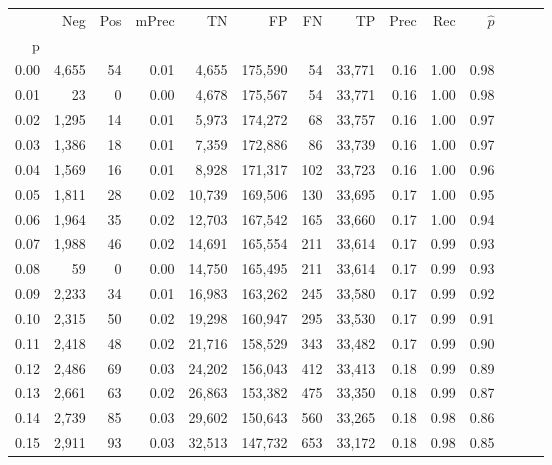 \begin{tabular}{rrrrrrrrrrrrrr}
\toprule
{} &    Neg &    Pos & mPrec &       TN &       FP &      FN &      TP &  Prec &   Rec & $\hat{p}$ \\
p    &        &        &       &          &          &         &         &       &       &           \\
\midrule
0.00 &  4,655 &     54 &  0.01 &    4,655 &  175,590 &      54 &  33,771 &  0.16 &  1.00 &      0.98 \\
0.01 &     23 &      0 &  0.00 &    4,678 &  175,567 &      54 &  33,771 &  0.16 &  1.00 &      0.98 \\
0.02 &  1,295 &     14 &  0.01 &    5,973 &  174,272 &      68 &  33,757 &  0.16 &  1.00 &      0.97 \\
0.03 &  1,386 &     18 &  0.01 &    7,359 &  172,886 &      86 &  33,739 &  0.16 &  1.00 &      0.97 \\
0.04 &  1,569 &     16 &  0.01 &    8,928 &  171,317 &     102 &  33,723 &  0.16 &  1.00 &      0.96 \\
0.05 &  1,811 &     28 &  0.02 &   10,739 &  169,506 &     130 &  33,695 &  0.17 &  1.00 &      0.95 \\
0.06 &  1,964 &     35 &  0.02 &   12,703 &  167,542 &     165 &  33,660 &  0.17 &  1.00 &      0.94 \\
0.07 &  1,988 &     46 &  0.02 &   14,691 &  165,554 &     211 &  33,614 &  0.17 &  0.99 &      0.93 \\
0.08 &     59 &      0 &  0.00 &   14,750 &  165,495 &     211 &  33,614 &  0.17 &  0.99 &      0.93 \\
0.09 &  2,233 &     34 &  0.01 &   16,983 &  163,262 &     245 &  33,580 &  0.17 &  0.99 &      0.92 \\
0.10 &  2,315 &     50 &  0.02 &   19,298 &  160,947 &     295 &  33,530 &  0.17 &  0.99 &      0.91 \\
0.11 &  2,418 &     48 &  0.02 &   21,716 &  158,529 &     343 &  33,482 &  0.17 &  0.99 &      0.90 \\
0.12 &  2,486 &     69 &  0.03 &   24,202 &  156,043 &     412 &  33,413 &  0.18 &  0.99 &      0.89 \\
0.13 &  2,661 &     63 &  0.02 &   26,863 &  153,382 &     475 &  33,350 &  0.18 &  0.99 &      0.87 \\
0.14 &  2,739 &     85 &  0.03 &   29,602 &  150,643 &     560 &  33,265 &  0.18 &  0.98 &      0.86 \\
0.15 &  2,911 &     93 &  0.03 &   32,513 &  147,732 &     653 &  33,172 &  0.18 &  0.98 &      0.85 \\

\end{tabular}
